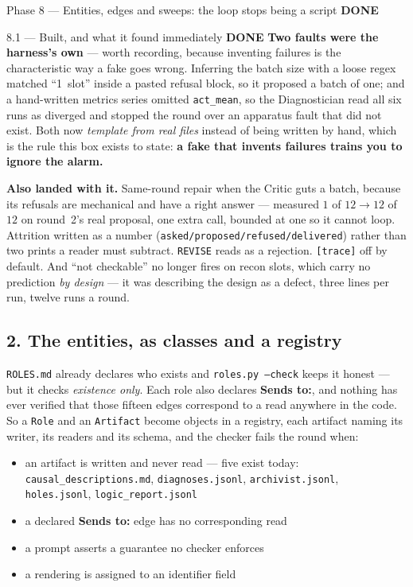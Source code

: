 \documentclass[11pt,a4paper]{article}
\newcommand{\code}[1]{\texttt{#1}}
\newcommand{\done}{\textcolor{good}{\textbf{DONE}}}
\begin{document}
\begin{phasebox}{Phase 8 --- Entities, edges and sweeps: the loop stops being a script \hfill \done}
\begin{resultbox}{8.1 --- Built, and what it found immediately \hfill \done}
\smallskip
\textbf{Two faults were the harness's own} --- worth recording, because inventing failures is the
characteristic way a fake goes wrong. Inferring the batch size with a loose regex matched
``1~slot'' inside a pasted refusal block, so it proposed a batch of one; and a hand-written metrics
series omitted \code{act\_mean}, so the Diagnostician read all six runs as diverged and stopped the
round over an apparatus fault that did not exist. Both now \emph{template from real files} instead
of being written by hand, which is the rule this box exists to state: \textbf{a fake that invents
failures trains you to ignore the alarm.}

\smallskip
\textbf{Also landed with it.} Same-round repair when the Critic guts a batch, because its refusals
are mechanical and have a right answer --- measured $1$ of $12 \to 12$ of $12$ on round~2's real
proposal, one extra call, bounded at one so it cannot loop. Attrition written as a number
(\code{asked/proposed/refused/delivered}) rather than two prints a reader must subtract.
\code{REVISE} reads as a rejection. \code{[trace]} off by default. And ``not checkable'' no longer
fires on recon slots, which carry no prediction \emph{by design} --- it was describing the design
as a defect, three lines per run, twelve runs a round.
\end{resultbox}

\subsection*{2. The entities, as classes and a registry}
\code{ROLES.md} already declares who exists and \code{roles.py --check} keeps it honest --- but it
checks \emph{existence only}. Each role also declares \textbf{Sends to:}, and nothing has ever
verified that those fifteen edges correspond to a read anywhere in the code. So a \code{Role} and
an \code{Artifact} become objects in a registry, each artifact naming its writer, its readers and
its schema, and the checker fails the round when:

\begin{itemize}\itemsep2pt
\item an artifact is written and never read --- five exist today: \code{causal\_descriptions.md},
      \code{diagnoses.jsonl}, \code{archivist.jsonl}, \code{holes.jsonl}, \code{logic\_report.jsonl}
\item a declared \textbf{Sends to:} edge has no corresponding read
\item a prompt asserts a guarantee no checker enforces
\item a rendering is assigned to an identifier field
\end{itemize}


\end{phasebox}
\end{document}
